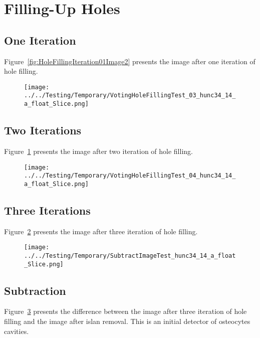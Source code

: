 \documentclass{InsightArticle}
\begin{document}
\section{Filling-Up Holes}

\subsection{One Iteration}

Figure~\ref{fig:HoleFillingIteration01Image2} presents the image after one iteration of hole filling.



\clearpage
\begin{figure}
\center
\texttt{[image: ../../Testing/Temporary/VotingHoleFillingTest\_03\_hunc34\_14\_a\_float\_Slice.png]}
\label{fig:HoleFillingIteration02Image2}
\end{figure}

\subsection{Two Iterations}

Figure~\ref{fig:HoleFillingIteration02Image2} presents the image after two iteration of hole filling.



\clearpage
\begin{figure}
\center
\texttt{[image: ../../Testing/Temporary/VotingHoleFillingTest\_04\_hunc34\_14\_a\_float\_Slice.png]}
\label{fig:HoleFillingIteration03Image3}
\end{figure}

\subsection{Three Iterations}

Figure~\ref{fig:HoleFillingIteration03Image3} presents the image after three iteration of hole filling.


\clearpage
\begin{figure}
\center
\texttt{[image: ../../Testing/Temporary/SubtractImageTest\_hunc34\_14\_a\_float\_Slice.png]}
\label{fig:SubtractionImage02}
\end{figure}

\subsection{Subtraction}

Figure~\ref{fig:SubtractionImage02} presents the difference between the image
after three iteration of hole filling and the image after islan removal. This
is an initial detector of osteocytes cavities.


%
%



\end{document}
